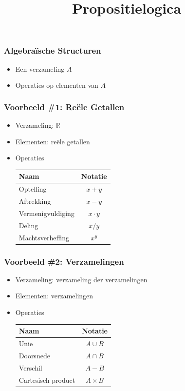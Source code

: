 \documentclass[dutch]{../khlslides}
\title{Propositielogica}
\institute[KHL]{KHLeuven}
\newcommand{\union}{\cup}
\newcommand{\intersect}{\cap}
\begin{document}
\maketitle

\begin{frame}
  \frametitle{Algebra\"ische Structuren}
  \begin{itemize}
    \item Een verzameling $A$
    \item Operaties op elementen van $A$
  \end{itemize}
\end{frame}

\begin{frame}
  \frametitle{Voorbeeld \#1: Re\"ele Getallen}
  \begin{itemize}
    \item Verzameling: $\mathbb{R}$
    \item Elementen: re\"ele getallen
    \item Operaties
          \begin{center}
            \begin{tabular}{lc}
              \bf Naam & \bf Notatie \\
              \toprule
              Optelling & $x + y$ \\
              Aftrekking & $x - y$ \\
              Vermenigvuldiging & $x \cdot y$ \\
              Deling & $x / y$ \\
              Machtsverheffing & $x^y$
            \end{tabular}
          \end{center}
  \end{itemize}
\end{frame}

\begin{frame}
  \frametitle{Voorbeeld \#2: Verzamelingen}
  \begin{itemize}
    \item Verzameling: verzameling der verzamelingen
    \item Elementen: verzamelingen
    \item Operaties
          \begin{center}
            \begin{tabular}{lc}
              \bf Naam & \bf Notatie \\
              \toprule
              Unie & $A \union B$ \\
              Doorsnede & $A \intersect B$ \\
              Verschil & $A - B$ \\
              Cartesisch product & $A \times B$
            \end{tabular}
          \end{center}
  \end{itemize}
\end{frame}
\end{document}
